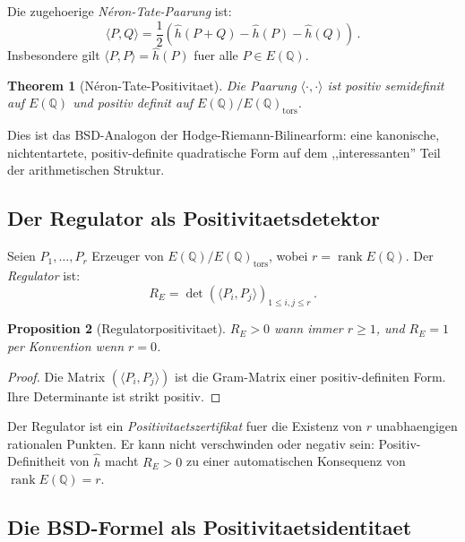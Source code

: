 \documentclass[aps,prd,twocolumn,superscriptaddress,nofootinbib]{revtex4-2}
\newtheorem{theorem}{Theorem}[section]
\newtheorem{proposition}[theorem]{Proposition}
\theoremstyle{definition}
\theoremstyle{remark}
\DeclareMathOperator{\rank}{rank}
\begin{document}
Die zugehoerige \textit{N\'eron-Tate-Paarung} ist:
\begin{equation}
\langle P, Q \rangle = \frac{1}{2}\left(\hat{h}(P+Q) - \hat{h}(P) - \hat{h}(Q)\right)\,.
\label{eq:NT_pairing}
\end{equation}
Insbesondere gilt $\langle P, P \rangle = \hat{h}(P)$ fuer alle $P \in E(\mathbb{Q})$.

\begin{theorem}[N\'eron-Tate-Positivitaet]
\label{thm:NT_positive}
Die Paarung $\langle \cdot, \cdot \rangle$ ist positiv semidefinit auf $E(\mathbb{Q})$ und positiv definit auf $E(\mathbb{Q})/E(\mathbb{Q})_{\mathrm{tors}}$.
\end{theorem}

Dies ist das BSD-Analogon der Hodge-Riemann-Bilinearform: eine kanonische, nichtentartete, positiv-definite quadratische Form auf dem ,,interessanten'' Teil der arithmetischen Struktur.

\subsection{Der Regulator als Positivitaetsdetektor}

Seien $P_1, \ldots, P_r$ Erzeuger von $E(\mathbb{Q})/E(\mathbb{Q})_{\mathrm{tors}}$, wobei $r = \rank E(\mathbb{Q})$. Der \textit{Regulator} ist:
\begin{equation}
R_E = \det\!\left(\langle P_i, P_j \rangle\right)_{1 \leq i,j \leq r}\,.
\label{eq:regulator}
\end{equation}

\begin{proposition}[Regulatorpositivitaet]
\label{prop:reg_positive}
$R_E > 0$ wann immer $r \geq 1$, und $R_E = 1$ per Konvention wenn $r = 0$.
\end{proposition}

\begin{proof}
Die Matrix $(\langle P_i, P_j \rangle)$ ist die Gram-Matrix einer positiv-definiten Form. Ihre Determinante ist strikt positiv.
\end{proof}

Der Regulator ist ein \textit{Positivitaetszertifikat} fuer die Existenz von $r$ unabhaengigen rationalen Punkten. Er kann nicht verschwinden oder negativ sein: Positiv-Definitheit von $\hat{h}$ macht $R_E > 0$ zu einer automatischen Konsequenz von $\rank E(\mathbb{Q}) = r$.

\subsection{Die BSD-Formel als Positivitaetsidentitaet}
\end{document}
